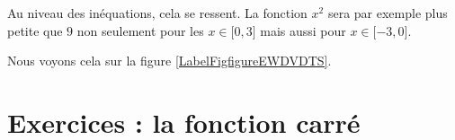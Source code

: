 Au niveau des inéquations, cela se ressent. La fonction \( x^2\) sera par exemple plus petite que \( 9\) non seulement pour les \( x\in\mathopen[ 0 , 3 \mathclose]\) mais aussi pour \( x\in\mathopen[ -3 , 0 \mathclose]\).

Nous voyons cela sur la figure \ref{LabelFigfigureEWDVDTS}. %
\newcommand{\CaptionFigfigureEWDVDTS}{La résulution graphique d'une inéquation avec la fonction carré.}


\section{Exercices : la fonction carré}


